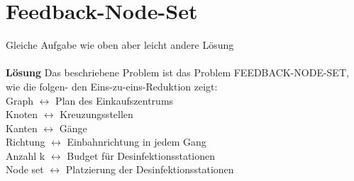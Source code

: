 \section{Feedback-Node-Set}
Gleiche Aufgabe wie oben aber leicht andere Lösung\\
\\
\textbf{Lösung}
Das beschriebene Problem ist das Problem FEEDBACK-NODE-SET, wie die folgen-
den Eins-zu-eins-Reduktion zeigt:\\
Graph $\leftrightarrow$ Plan des Einkaufszentrums\\
Knoten $\leftrightarrow$ Kreuzungsstellen\\
Kanten $\leftrightarrow$ Gänge\\
Richtung $\leftrightarrow$ Einbahnrichtung in jedem Gang\\
Anzahl k $\leftrightarrow$ Budget für Desinfektionsstationen\\
Node set $\leftrightarrow$ Platzierung der Desinfektionsstationen\\